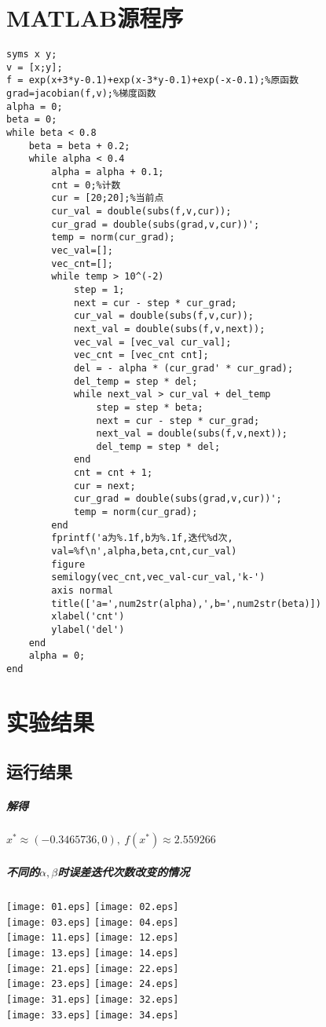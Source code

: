 \documentclass[12pt,a4paper,UTF-8]{article}
\begin{document}
\section{MATLAB源程序}
\begin{lstlisting}
syms x y;
v = [x;y];
f = exp(x+3*y-0.1)+exp(x-3*y-0.1)+exp(-x-0.1);%原函数
grad=jacobian(f,v);%梯度函数
alpha = 0;
beta = 0;
while beta < 0.8
	beta = beta + 0.2;
	while alpha < 0.4
		alpha = alpha + 0.1;
		cnt = 0;%计数
		cur = [20;20];%当前点
		cur_val = double(subs(f,v,cur));
		cur_grad = double(subs(grad,v,cur))';
		temp = norm(cur_grad);
		vec_val=[];
		vec_cnt=[];
		while temp > 10^(-2)
			step = 1;
			next = cur - step * cur_grad;
			cur_val = double(subs(f,v,cur));
			next_val = double(subs(f,v,next));
			vec_val = [vec_val cur_val];
			vec_cnt = [vec_cnt cnt];
			del = - alpha * (cur_grad' * cur_grad);
			del_temp = step * del;
			while next_val > cur_val + del_temp
				step = step * beta;
				next = cur - step * cur_grad;
				next_val = double(subs(f,v,next));
				del_temp = step * del;
			end
			cnt = cnt + 1;
			cur = next;
			cur_grad = double(subs(grad,v,cur))';
			temp = norm(cur_grad);
		end
		fprintf('a为%.1f,b为%.1f,迭代%d次,
		val=%f\n',alpha,beta,cnt,cur_val)      
		figure
		semilogy(vec_cnt,vec_val-cur_val,'k-')
		axis normal
		title(['a=',num2str(alpha),',b=',num2str(beta)])       
		xlabel('cnt') 
		ylabel('del')
	end
	alpha = 0;
end

\end{lstlisting}

\section{实验结果}

\subsection{运行结果} 

\subparagraph{解得}$x^{*} \approx (-0.3465736, 0),\ f(x^{*}) \approx 2.559266$

\subparagraph{不同的$\alpha, \beta$时误差迭代次数改变的情况\\}
\texttt{[image: 01.eps]}
\texttt{[image: 02.eps]}\\
\texttt{[image: 03.eps]}
\texttt{[image: 04.eps]}\\
\texttt{[image: 11.eps]}
\texttt{[image: 12.eps]}\\
\texttt{[image: 13.eps]}
\texttt{[image: 14.eps]}\\
\texttt{[image: 21.eps]}
\texttt{[image: 22.eps]}\\
\texttt{[image: 23.eps]}
\texttt{[image: 24.eps]}\\
\texttt{[image: 31.eps]}
\texttt{[image: 32.eps]}\\
\texttt{[image: 33.eps]}
\texttt{[image: 34.eps]}\\
\end{document}
